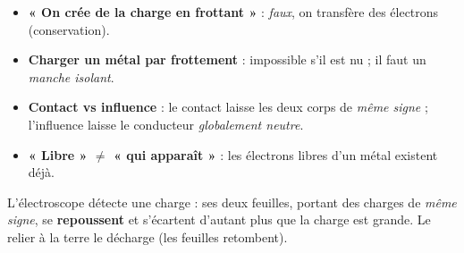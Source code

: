 \documentclass[11pt,a4paper]{article}
\begin{document}
\begin{piege}
\begin{itemize}[leftmargin=1.5em,topsep=1pt,itemsep=1pt]
  \item \textbf{« On crée de la charge en frottant »} : \emph{faux}, on transfère des électrons
        (conservation).
  \item \textbf{Charger un métal par frottement} : impossible s'il est nu ; il faut un
        \emph{manche isolant}.
  \item \textbf{Contact vs influence} : le contact laisse les deux corps de \emph{même signe} ;
        l'influence laisse le conducteur \emph{globalement neutre}.
  \item \textbf{« Libre » $\ne$ « qui apparaît »} : les électrons libres d'un métal existent déjà.
\end{itemize}
\end{piege}

\begin{remarque}[l'électroscope]
L'électroscope détecte une charge : ses deux feuilles, portant des charges de \emph{même signe},
se \textbf{repoussent} et s'écartent d'autant plus que la charge est grande. Le relier à la terre
le décharge (les feuilles retombent).
\end{remarque}
\end{document}
